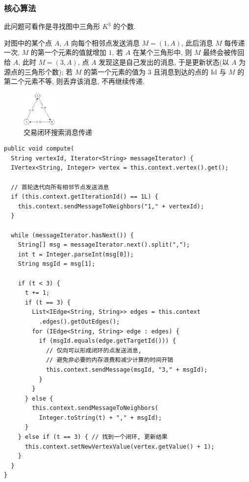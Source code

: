 \subsubsection{核心算法}
此问题可看作是寻找图中三角形 $ K^{3} $ 的个数.

对图中的某个点 $ A $, $ A $ 向每个相邻点发送消息 $ M=(1, A) $, 此后消息
$ M $ 每传递一次, $ M $ 的第一个元素的值就增加 $ 1 $, 若 $ A $ 在某个三角形中,
则 $ M $ 最终会被传回给 $ A $, 此时 $ M = (3, A) $, 点 $ A $
发现这是自己发出的消息, 于是更新状态(以 $ A $ 为源点的三角形个数);
若 $ M $ 的第一个元素的值为 $ 3 $ 且消息到达的点的 Id 与 $ M $ 的第二个元素不等,
则丢弃该消息, 不再继续传递.

\begin{figure}[H]
  \begin{center}
    \includegraphics[width=0.15\textwidth]{./figures/pro1.jpg}
  \end{center}
  \caption{交易闭环搜索消息传递}
\end{figure}

\begin{center}
\begin{verbatim}
public void compute(
  String vertexId, Iterator<String> messageIterator) {
  IVertex<String, Integer> vertex = this.context.vertex().get();

  // 首轮迭代向所有相邻节点发送消息
  if (this.context.getIterationId() == 1L) {
    this.context.sendMessageToNeighbors("1," + vertexId);
  }

  while (messageIterator.hasNext()) {
    String[] msg = messageIterator.next().split(",");
    int t = Integer.parseInt(msg[0]);
    String msgId = msg[1];

    if (t < 3) {
      t += 1;
      if (t == 3) {
        List<IEdge<String, String>> edges = this.context
          .edges().getOutEdges();
        for (IEdge<String, String> edge : edges) {
          if (msgId.equals(edge.getTargetId())) {
            // 仅向可以形成闭环的点发送消息,
            // 避免非必要的内存浪费和减少计算的时间开销
            this.context.sendMessage(msgId, "3," + msgId);
          }
        }
      } else {
        this.context.sendMessageToNeighbors(
          Integer.toString(t) + "," + msgId);
      }
    } else if (t == 3) { // 找到一个闭环, 更新结果
      this.context.setNewVertexValue(vertex.getValue() + 1);
    }
  }
}
\end{verbatim}
\end{center}

